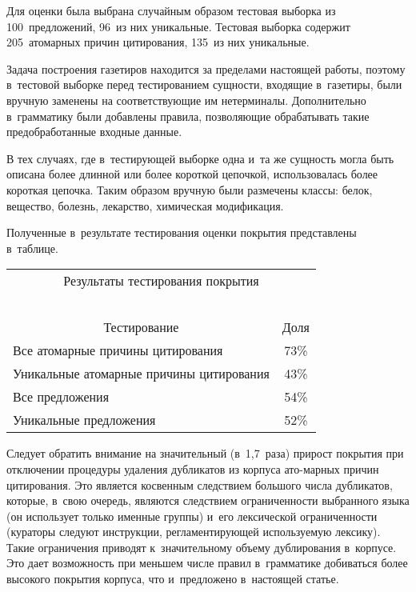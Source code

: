 \begin{multicols}{2}
  Для оценки была выбрана случайным образом тестовая выборка из 
100~предложений, 96~из них уникальные. Тестовая выборка содержит 
205~атомарных причин цитирования, 135~из них уникальные.
  
  Задача построения газетиров находится за пределами настоящей работы, 
поэтому в~тестовой выборке перед тестированием сущности, входящие 
в~газетиры, были вручную заменены на соответствующие им нетерминалы. 
Дополнительно в~грамматику были добавлены правила, позволяющие 
обрабатывать такие предобработанные входные данные.
  
  В тех случаях, где в~тестирующей выборке одна и~та же сущность могла быть 
описана более длинной или более короткой цепочкой, использовалась более 
короткая цепочка. Таким образом вручную были размечены классы: белок, 
вещество, болезнь, лекарство, химическая модификация.
  
  Полученные в~результате тестирования оценки покрытия представлены 
в~таблице.

{\small
  \begin{center}
  \tabcolsep=3pt
  \begin{tabular}{|l|c|}
  \multicolumn{2}{c}{Результаты тестирования покрытия}\\
  \multicolumn{2}{c}{\ }\\[-6pt]
  \hline
  \multicolumn{1}{|c|}{Тестирование} & Доля\\
  \hline
  Все атомарные причины цитирования&73\%\\
  Уникальные атомарные причины цитирования&43\%\\
  Все предложения&54\%\\
  Уникальные предложения&52\%\\
  \hline
  \end{tabular}
  \end{center}
}

\vspace*{6pt}
  


  
  Следует обратить внимание на значительный (в~1,7~раза) прирост покрытия 
при отключении процедуры удаления дубликатов из корпуса ато-\linebreak марных 
причин цитирования. Это является кос\-венным следствием большого числа 
дубликатов, которые, в~свою очередь, являются следствием огра\-ни\-чен\-ности 
выбранного языка (он использует только именные группы) и~его лексической 
огра\-ни\-чен\-ности (кураторы следуют инструкции, рег\-ламентирующей 
используемую лексику). Такие ограничения приводят к~значительному объему 
дуб\-ли\-рования в~корпусе. Это дает возможность при меньшем числе правил 
в~грамматике добиваться более высокого покрытия корпуса, что и~предложено 
в~настоящей статье.


\end{multicols}
